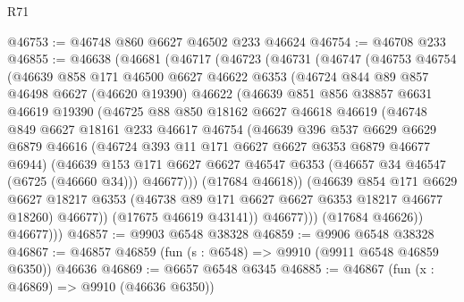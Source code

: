 \begin{lexlean}{R71}
\begin{coremodule}
@46753 := @46748 @860 @6627 @46502 @233 @46624
@46754 := @46708 @233
@46855 := @46638
    (@46681
      (@46717
        (@46723
          (@46731
            (@46747
              (@46753
                @46754
                (@46639
                  @858
                  @171
                  @46500
                  @6627
                  @46622
                  @6353
                  (@46724
                    @844
                    @89
                    @857
                    @46498
                    @6627
                    (@46620 @19390)
                    @46622
                    (@46639
                      @851
                      @856
                      @38857
                      @6631
                      @46619
                      @19390
                      (@46725
                        @88
                        @850
                        @18162
                        @6627
                        @46618
                        @46619
                        (@46748
                          @849
                          @6627
                          @18161
                          @233
                          @46617
                          @46754
                          (@46639
                            @396
                            @537
                            @6629
                            @6629
                            @6879
                            @46616
                            (@46724 @393 @11 @171 @6627 @6627 @6353 @6879 @46677 @6944)
                            (@46639
                              @153
                              @171
                              @6627
                              @6627
                              @46547
                              @6353
                              (@46657 @34 @46547 (@6725 (@46660 @34)))
                              @46677)))
                        (@17684 @46618))
                      (@46639
                        @854
                        @171
                        @6629
                        @6627
                        @18217
                        @6353
                        (@46738 @89 @171 @6627 @6627 @6353 @18217 @46677 @18260)
                        @46677))
                    (@17675 @46619 @43141))
                  @46677)))
            (@17684 @46626))
          @46677)))
@46857 := @9903 @6548 @38328
@46859 := @9906 @6548 @38328
@46867 := @46857 @46859 (fun (s : @6548) => @9910 (@9911 @6548 @46859 @6350)) @46636
@46869 := @6657 @6548 @6345
@46885 := @46867
    (fun (x : @46869) => @9910 (@46636 @6350))

\end{coremodule}
\end{lexlean}

